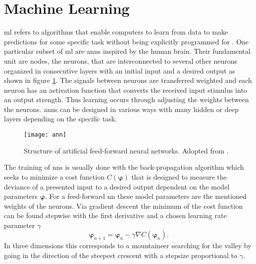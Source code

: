 \section{Machine Learning}
\ac{ml} refers to algorithms that enable computers to learn from data to make predictions for some specific task without being explicitly programmed for \citep{kubat2021introduction}. One particular subset of \ac{ml} are \acp{ann} inspired by the human brain. Their fundamental unit are nodes, the neurons, that are interconnected to several other neurons organized in consecutive layers with an initial input and a desired output as shown in figure \ref{fig:ann}. The signals between neurons are transferred weighted and each neuron has an activation function that converts the received input stimulus into an output strength. Thus learning occurs through adjusting the weights between the neurons. \acp{ann} can be designed in various ways with many hidden or deep layers depending on the specific task.
\begin{figure}
    \centering
    \texttt{[image: ann]}
    \caption[]{Structure of artificial feed-forward neural networks. Adopted from \citep{8114708}.}
    \label{fig:ann}
\end{figure}

The training of \acp{nn} is usually done with the back-propagation algorithm which seeks to minimize a cost function $C(\bm{\varphi})$ that is designed to measure the deviance of a presented input to a desired output dependent on the model parameters $\bm{\varphi}$. For a feed-forward \ac{nn} these model parameters are the mentioned weights of the neurons. Via gradient descent the minimum of the cost function can be found stepwise with the first derivative and a chosen learning rate parameter $\gamma$
\begin{equation}
    \bm{\varphi}_{n+1} = \bm{\varphi}_n-\gamma\nabla C(\bm{\varphi}_n).
    \label{eq:grad_descent}
\end{equation}
In three dimensions this corresponds to a mountaineer searching for the valley by going in the direction of the steepest crescent with a stepsize proportional to $\gamma$.



